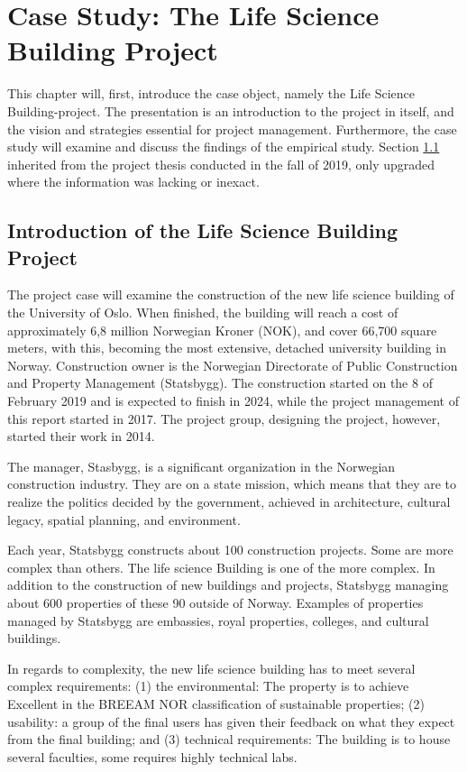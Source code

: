 
\chapter{Case Study: The Life Science Building Project}
This chapter will, first, introduce the case object, namely the Life Science Building-project. The presentation is an introduction to the project in itself, and the vision and strategies essential for project management. Furthermore, the case study will examine and discuss the findings of the empirical study. Section \ref{sec:case-intro} inherited from the project thesis conducted in the fall of 2019, only upgraded where the information was lacking or inexact.

\section{Introduction of the Life Science Building Project} \label{sec:case-intro} 
The project case will examine the construction of the new life science building of the University of Oslo. When finished, the building will reach a cost of approximately 6,8 million Norwegian Kroner (NOK), and cover 66,700 square meters, with this, becoming the most extensive, detached university building in Norway. Construction owner is the Norwegian Directorate of Public Construction and Property Management (Statsbygg). The construction started on the 8 of February 2019 and is expected to finish in 2024, while the project management of this report started in 2017. The project group, designing the project, however, started their work in 2014.

The manager, Stasbygg, is a significant organization in the Norwegian construction industry. They are on a state mission, which means that they are to realize the politics decided by the government, achieved in architecture, cultural legacy, spatial planning, and environment. 

Each year, Statsbygg constructs about 100 construction projects. Some are more complex than others. The life science Building is one of the more complex. In addition to the construction of new buildings and projects, Statsbygg managing about 600 properties of these 90 outside of Norway. Examples of properties managed by Statsbygg are embassies, royal properties, colleges, and cultural buildings. 

In regards to complexity, the new life science building has to meet several complex requirements: (1) the environmental: The property is to achieve Excellent in the BREEAM NOR classification of sustainable properties; (2) usability: a group of the final users has given their feedback on what they expect from the final building; and (3) technical requirements: The building is to house several faculties, some requires highly technical labs.


